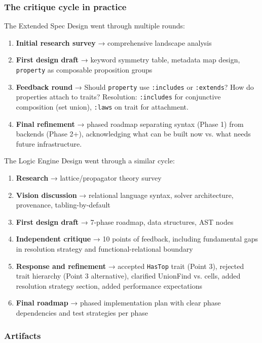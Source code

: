 \documentclass[11pt]{article}
\begin{document}
\subsubsection{The critique cycle in practice}
\label{sec:org2c0d6d3}

The Extended Spec Design went through multiple rounds:

\begin{enumerate}
\item \textbf{Initial research survey} → comprehensive landscape analysis
\item \textbf{First design draft} → keyword symmetry table, metadata map design,
\texttt{property} as composable proposition groups
\item \textbf{Feedback round} → Should \texttt{property} use \texttt{:includes} or \texttt{:extends}?
How do properties attach to traits? Resolution: \texttt{:includes} for
conjunctive composition (set union), \texttt{:laws} on trait for attachment.
\item \textbf{Final refinement} → phased roadmap separating syntax (Phase 1) from
backends (Phase 2+), acknowledging what can be built now vs. what
needs future infrastructure.
\end{enumerate}

The Logic Engine Design went through a similar cycle:

\begin{enumerate}
\item \textbf{Research} → lattice/propagator theory survey
\item \textbf{Vision discussion} → relational language syntax, solver architecture,
provenance, tabling-by-default
\item \textbf{First design draft} → 7-phase roadmap, data structures, AST nodes
\item \textbf{Independent critique} → 10 points of feedback, including fundamental
gaps in resolution strategy and functional-relational boundary
\item \textbf{Response and refinement} → accepted \texttt{HasTop} trait (Point 3), rejected
trait hierarchy (Point 3 alternative), clarified UnionFind vs. cells,
added resolution strategy section, added performance expectations
\item \textbf{Final roadmap} → phased implementation plan with clear phase
dependencies and test strategies per phase
\end{enumerate}
\subsubsection{Artifacts}
\label{sec:org0669fd2}
\end{document}
